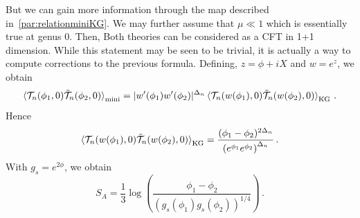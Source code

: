 \documentclass[a4paper]{article}
\begin{document}
But we can gain more information through the map described in~\ref{par:relationminiKG}. We may further assume that $\mu \ll 1$ which is essentially true at genus $0$. Then, Both theories can be considered as a CFT in 1+1 dimension. While this statement may be seen to be trivial, it is actually a way to compute corrections to the previous formula. Defining, $z = \phi + i X$ and $w = e^{z}$, we obtain 
\begin{equation}
  \braket{\mathcal{T}_{n}(\phi_1,0)\mathcal{\tilde{T}}_{n}(\phi_2,0)}_{\text{mini}} = |w'(\phi_1)w'(\phi_2)|^{\Delta_n} \braket{\mathcal{T}_{n}(w(\phi_1),0)\mathcal{\tilde{T}}_{n}(w(\phi_2),0)}_{\text{KG}}\,.
\end{equation}
Hence
\begin{equation}
  \braket{\mathcal{T}_{n}(w(\phi_1),0)\mathcal{\tilde{T}}_{n}(w(\phi_2),0)}_{\text{KG}} = \frac{(\phi_1-\phi_2)^{2\Delta_n}}{\left(e^{\phi_1}e^{\phi_2}\right)^{\Delta_n}}\,.
\end{equation}
With $g_{s}= e^{2\phi}$, we obtain
\begin{equation}
  S_{A} = \frac{1}{3}\log\left(\frac{\phi_1-\phi_2}{(g_s(\phi_1)g_{s}(\phi_2))^{1/4}}\right)\,.
\end{equation}



\end{document}
